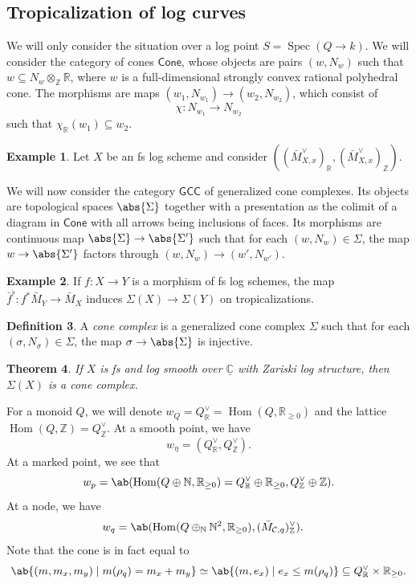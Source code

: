 \documentclass{amsart}
\newtheorem{thm}{Theorem}[section]
\theoremstyle{definition}
\newtheorem{defn}[thm]{Definition}
\newtheorem{exm}[thm]{Example}
\theoremstyle{remark}
\theoremstyle{plain}
\theoremstyle{definition}
\theoremstyle{remark}
\newcommand{\N}{\mathbb{N}}
\newcommand{\R}{\mathbb{R}}
\newcommand{\C}{\mathbb{C}}
\newcommand{\Z}{\mathbb{Z}}
\newcommand{\mc}[1]{\mathcal{#1}}
\newcommand{\ms}[1]{\mathsf{#1}}
\newcommand{\ul}[1]{\underline{#1}}
\newcommand{\1}{\mathbf{1}}
\newcommand{\2}{\mathbf{2}}
\newcommand{\3}{\mathbf{3}}
\DeclareMathOperator{\Hom}{Hom}
\DeclareMathOperator{\Spec}{Spec}
\begin{document}
\subsection{Tropicalization of log curves}%
\label{sub:Tropicalization of log curves}

We will only consider the situation over a log point \(S = \Spec(Q \to k)\). We will consider the category of cones \(\ms{Cone}\), whose objects are pairs \((w, N_w)\) such that \(w \subseteq N_w \otimes_{\Z} \R\), where \(w\) is a full-dimensional strongly convex rational polyhedral cone. The morphisms are maps \((w_1, N_{w_1}) \to (w_2, N_{w_2})\), which consist of
\[ \chi \colon N_{w_1} \to N_{w_2} \]
such that \(\chi_{\R}(w_1) \subseteq w_2\). 

\begin{exm}
    Let \(X\) be an fs log scheme and consider \(( (\bar{M}_{X,x}^{\vee})_{\R}, (\bar{M}_{X,x}^{\vee})_{\Z} )\).
\end{exm}

We will now consider the category \(\ms{GCC}\) of generalized cone complexes. Its objects are topological spaces \(\abs{\Sigma}\) together with a presentation as the colimit of a diagram in \(\ms{Cone}\) with all arrows being inclusions of faces. Its morphisms are continuous map \(\abs{\Sigma} \to \abs{\Sigma'}\) such that for each \((w, N_w) \in \Sigma\), the map \(w \to \abs{\Sigma'}\) factors through \((w, N_w) \to (w', N_{w'})\).

\begin{exm}
    If \(f \colon X \to Y\) is a morphism of fs log schemes, the map \(\bar{f}^{\flat} \colon f^* \bar{M}_Y \to \bar{M}_X\) induces \(\Sigma(X) \to \Sigma(Y)\) on tropicalizations.
\end{exm}

\begin{defn}
    A \textit{cone complex} is a generalized cone complex \(\Sigma\) such that for each \((\sigma, N_{\sigma}) \in \Sigma\), the map \(\sigma \to \abs{\Sigma}\) is injective.
\end{defn}

\begin{thm}
    If \(X\) is fs and log smooth over \(\ul{\C}\) with Zariski log structure, then \(\Sigma(X)\) is a cone complex.
\end{thm}

For a monoid \(Q\), we will denote \(w_Q = Q_{\R}^{\vee} = \Hom(Q, \R_{\geq 0})\) and the lattice \(\Hom(Q, \Z) = Q_{\Z}^{\vee}\). At a smooth point, we have
\[ w_{\eta} = (Q_{\R}^{\vee}, Q_{\Z}^{\vee}). \]
At a marked point, we see that
\[ w_p = \ab(\Hom (Q \oplus \N, \R_{\geq 0}) = Q_{\R}^{\vee} \oplus \R_{\geq 0}, Q_{\Z}^{\vee}\oplus \Z). \]
At a node, we have
\begin{align*}
    w_q &= \ab(\Hom(Q \oplus_{\N} \N^2, \R_{\geq 0}), ( \bar{M}_{\mc{C}, q} )_{\Z}^{\vee}).
\end{align*}
Note that the cone is in fact equal to
\[ \ab\{(m, m_x, m_y) \mid m(\rho_q) = m_x + m_y \} \simeq \ab\{(m, e_x) \mid e_x \leq m(\rho_q) \} \subseteq Q_{\R}^{\vee} \times \R_{\geq 0}. \]
\end{document}
